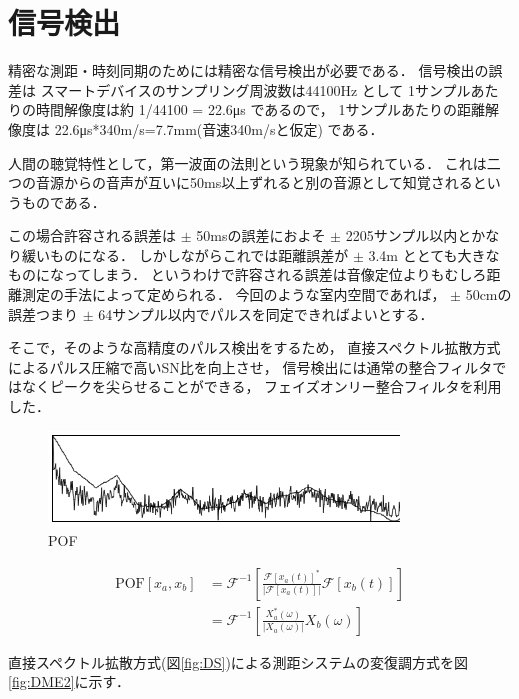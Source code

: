 
\section{信号検出}

精密な測距・時刻同期のためには精密な信号検出が必要である．
信号検出の誤差は
スマートデバイスのサンプリング周波数は44100Hz
として
1サンプルあたりの時間解像度は約 1/44100 = 22.6μs
であるので，
1サンプルあたりの距離解像度は 22.6μs*340m/s=7.7mm(音速340m/sと仮定)
である．

人間の聴覚特性として，第一波面の法則という現象が知られている\cite{Haas}．
これは二つの音源からの音声が互いに50ms以上ずれると別の音源として知覚されるというものである．

この場合許容される誤差は
$\pm$ 50msの誤差におよそ $\pm$ 2205サンプル以内とかなり緩いものになる．
しかしながらこれでは距離誤差が $\pm$ 3.4m ととても大きなものになってしまう．
というわけで許容される誤差は音像定位よりもむしろ距離測定の手法によって定められる．
今回のような室内空間であれば，
$\pm$ 50cmの誤差つまり $\pm$ 64サンプル以内でパルスを同定できればよいとする．

そこで，そのような高精度のパルス検出をするため，
直接スペクトル拡散方式によるパルス圧縮で高いSN比を向上させ，
信号検出には通常の整合フィルタではなくピークを尖らせることができる，
フェイズオンリー整合フィルタ\cite{pof}を利用した．

\begin{figure}[tb]\centering
  \hspace{-2mm}\includegraphics[clip,width=1.1\hsize]{img/POF.png}
  \caption{POF}\label{fig:POF}
\end{figure}

$$
\begin{aligned}
\mathrm{POF}[x_a, x_b]
&= \mathcal{F}^{-1}\left[\frac{\mathcal{F}\left[x_a(t)\right]^*}{|\mathcal{F}\left[x_a(t)\right]|}\mathcal{F}\left[x_b(t)\right]\right] \\
&= \mathcal{F}^{-1}\left[\frac{X_a^*(\omega)}{|X_a(\omega)|}X_b(\omega)\right]
\end{aligned}
$$


直接スペクトル拡散方式(図\ref{fig:DS})による測距システムの変復調方式を図\ref{fig:DME2}に示す．

